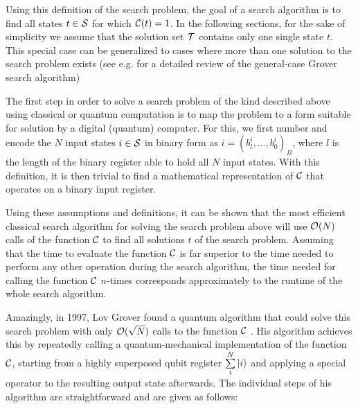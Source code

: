 \smallskip

Using this definition of the search problem, the goal of a search algorithm is to find all states $t\in\begin{mathcal}S\end{mathcal}$ for which $\Or(t) = 1$. In the following sections, for the sake of simplicity we assume that the solution set $\begin{mathcal}T\end{mathcal}$ contains only one single state $t$. This special case can be generalized to cases where more than one solution to the search problem exists (see e.g. \cite{nielsen_quantum_2000,mermin_quantum_2007} for a detailed review of the general-case Grover search algorithm)

\smallskip

The first step in order to solve a search problem of the kind described above using classical or quantum computation is to map the problem to a form suitable for solution by a digital (quantum) computer. For this, we first number and encode the $N$ input states $i \in \begin{mathcal}S\end{mathcal}$ in binary form as $i=(b^i_l,\hdots,b^i_0)_B$, where $l$ is the length of the binary register able to hold all $N$ input states. With this definition, it is then trivial to find a mathematical representation of $\Or$ that operates on a binary input register. 

\smallskip

Using these assumptions and definitions, it can be shown that the most efficient classical search algorithm for solving the search problem above will use $\begin{mathcal}O\end{mathcal}(N)$ calls of the function $\Or$ to find all solutions $t$ of the search problem. Assuming that the time to evaluate the function $\Or$ is far superior to the time needed to perform any other operation during the search algorithm, the time needed for calling the function $\Or$ $n$-times corresponds approximately to the runtime of the whole search algorithm.

\smallskip

Amazingly, in 1997, Lov Grover found a quantum algorithm that could solve this search problem with only $\begin{mathcal}O\end{mathcal}(\sqrt{N})$ calls to the function $\Or$ \citep{Grover_Quantum_1997}. His algorithm achieves this by repeatedly calling a quantum-mechanical implementation of the function $\Or$, starting from a highly superposed qubit register $\sum\limits_i^N \left| i \right>$ and applying a special operator to the resulting output state afterwards. The individual steps of his algorithm are straightforward and are given as follows:

